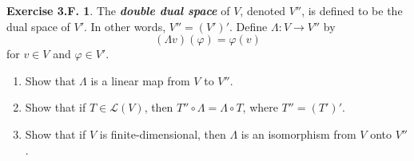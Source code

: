 \documentclass[12pt]{article}
\theoremstyle{definition}
\theoremstyle{exercise}
\newtheorem{exercise}{Exercise 3.F.}
\theoremstyle{solution}
\newcommand{\lmap}{\mathcal{L}}
\begin{document}
\begin{exercise}
\label{ex:34}
    The \textbf{\textit{double dual space}} of \( V \), denoted \( V'' \), is defined to be the dual space of \( V' \). In other words, \( V'' = (V')' \). Define \( \Lambda : V \to V'' \) by
    \[
        (\Lambda v)(\varphi) = \varphi(v)
    \]
    for \( v \in V \) and \( \varphi \in V' \).
    \begin{enumerate}
        \item Show that \( \Lambda \) is a linear map from \( V \) to \( V'' \).

        \item Show that if \( T \in \lmap(V) \), then \( T'' \circ \Lambda = \Lambda \circ T \), where \( T'' = (T')' \).

        \item Show that if \( V \) is finite-dimensional, then \( \Lambda \) is an isomorphism from \( V \) onto \( V'' \).
    \end{enumerate}

\end{exercise}
\end{document}
